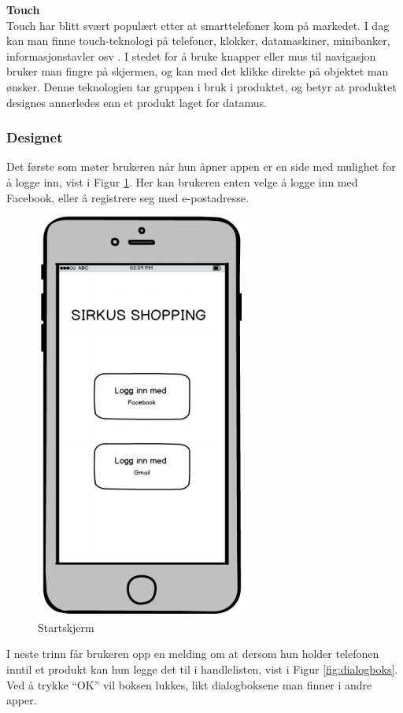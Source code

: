 \noindent\textbf{Touch}\\
Touch har blitt svært populært etter at smarttelefoner kom på markedet. I dag kan man finne touch-teknologi på telefoner, klokker, datamaskiner, minibanker,  informasjonstavler osv \cite[p.~197]{preece}. I stedet for å bruke knapper eller mus til navigasjon bruker man fingre på skjermen, og kan med det klikke direkte på objektet man ønsker. Denne teknologien tar gruppen i bruk i produktet, og betyr at produktet designes annerledes enn et produkt laget for datamus.

\subsubsection{Designet}
Det første som møter brukeren når hun åpner appen er en side med mulighet for å logge inn, vist i Figur \ref{fig:startskjerm}. Her kan brukeren enten velge å logge inn med Facebook, eller å registrere seg med e-postadresse.

\begin{figure}[H]
\includegraphics[scale=0.47]{images/prototype1/startskjerm}
\centering %
\caption{Startskjerm}
\label{fig:startskjerm}
\end{figure}

\noindent I neste trinn får brukeren opp en melding om at dersom hun holder telefonen inntil et produkt kan hun legge det til i handlelisten, vist i Figur \ref{fig:dialogboks}. Ved å trykke “OK” vil boksen lukkes, likt dialogboksene man finner i andre apper.

